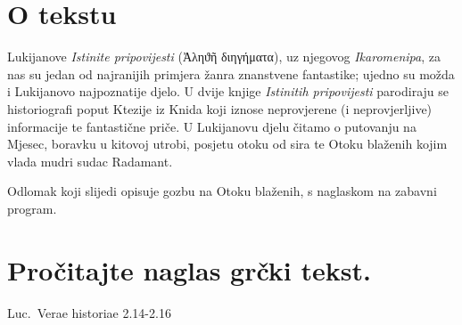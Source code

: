 


\section*{O tekstu}

Lukijanove \textit{Istinite pripovijesti} \textgreek[variant=ancient]{(Ἀληϑῆ διηγήματα),} uz njegovog \textit{Ikaromenipa}, za nas su jedan od najranijih primjera žanra znanstvene fantastike; ujedno su možda i Lukijanovo najpoznatije djelo. U dvije knjige \textit{Istinitih pripovijesti} parodiraju se historiografi poput Ktezije iz Knida koji iznose neprovjerene (i neprovjerljive) informacije te fantastične priče. U Lukijanovu djelu čitamo o putovanju na Mjesec, boravku u kitovoj utrobi, posjetu otoku od sira te Otoku blaženih kojim vlada mudri sudac Radamant. 

Odlomak koji slijedi opisuje gozbu na Otoku blaženih, s naglaskom na zabavni program.


\section*{Pročitajte naglas grčki tekst.}

Luc.\ Verae historiae 2.14-2.16


\medskip


